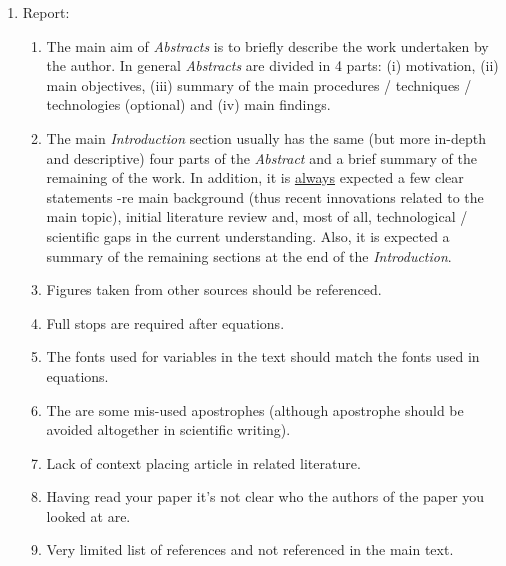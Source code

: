 \documentclass[14pt,twoside]{report}
\begin{document}
\begin{enumerate}

\item Report:
\begin{enumerate}
%
\item The main aim of {\it Abstracts} is to briefly describe the work undertaken by the author. In general {\it Abstracts} are divided in 4 parts: (i) motivation, (ii) main objectives, (iii) summary of the main procedures / techniques / technologies (optional) and (iv) main findings. 
%
\item The main {\it Introduction} section usually has the same (but more in-depth and descriptive) four parts of the {\it Abstract} and a brief summary of the remaining of the work. In addition, it is \underline{always} expected a few clear statements -re main background (thus recent innovations related to the main topic), initial literature review and, most of all, technological / scientific gaps in the current understanding. Also, it is expected a summary of the remaining sections at the end of the {\it Introduction}.
%
\item Figures taken from other sources should be referenced.
%
\item Full stops are required after equations.
%
\item The fonts used for variables in the text should match the fonts used in equations.
%
\item The are some mis-used apostrophes (although apostrophe should be avoided altogether in scientific writing).
%
\item Lack of context placing article in related literature.
%
\item Having read your paper it's not clear who the authors of the paper you looked at are.
%
\item Very limited list of references and not referenced in the main text.


\end{enumerate}
\end{enumerate}
\end{document}
